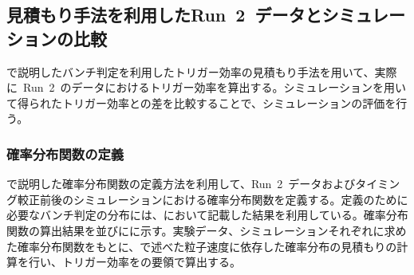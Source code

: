\subsection{見積もり手法を利用したRun~2~データとシミュレーションの比較}
で説明したバンチ判定を利用したトリガー効率の見積もり手法を用いて、実際に~Run~2~のデータにおけるトリガー効率を算出する。シミュレーションを用いて得られたトリガー効率との差を比較することで、シミュレーションの評価を行う。
\subsubsection{確率分布関数の定義}
で説明した確率分布関数の定義方法を利用して、Run~2~データおよびタイミング較正前後のシミュレーションにおける確率分布関数を定義する。定義のために必要なバンチ判定の分布には、において記載した結果を利用している。確率分布関数の算出結果を並びにに示す。実験データ、シミュレーションそれぞれに求めた確率分布関数をもとに、で述べた粒子速度に依存した確率分布の見積もりの計算を行い、トリガー効率をの要領で算出する。

